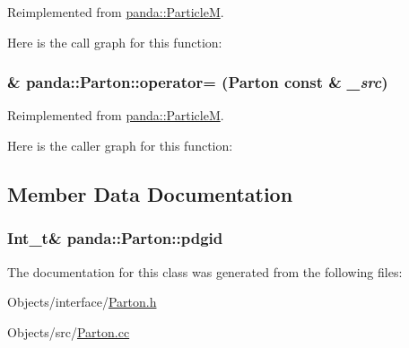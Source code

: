 Reimplemented from \hyperlink{classpanda_1_1ParticleM_a042f9e295576be022960ea88144e9022}{panda::ParticleM}.

Here is the call graph for this function:\hypertarget{classpanda_1_1Parton_a0def202110cf69ff7d9213cbf9db02ec}{
\subsubsection[{operator=}]{ \& panda::Parton::operator= ({\bf Parton} const \& {\em \_\-src})}}
\label{classpanda_1_1Parton_a0def202110cf69ff7d9213cbf9db02ec}


Reimplemented from \hyperlink{classpanda_1_1ParticleM_a37f7be4e1150b6080b47b005af730af5}{panda::ParticleM}.

Here is the caller graph for this function:

\subsection{Member Data Documentation}
\hypertarget{classpanda_1_1Parton_addc28c89761706cb6a9b88c4d910f542}{
\subsubsection[{pdgid}]{\setlength{\rightskip}{0pt plus 5cm}Int\_\-t\& {\bf panda::Parton::pdgid}}}
\label{classpanda_1_1Parton_addc28c89761706cb6a9b88c4d910f542}


The documentation for this class was generated from the following files:\begin{DoxyCompactItemize}
\item 
Objects/interface/\hyperlink{Parton_8h}{Parton.h}\item 
Objects/src/\hyperlink{Parton_8cc}{Parton.cc}\end{DoxyCompactItemize}
